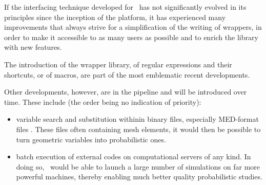 
If the interfacing technique developed for \OT\ has not significantly evolved in its principles since the inception of the platform, it has experienced many improvements that always strive for a simplification of the writing of wrappers, in order to make it accessible to as many users as possible and to enrich the library with new features.

The introduction of the wrapper library, of regular expressions and their shortcuts, or of macros, are part of the most emblematic recent developments.

Other developments, however, are in the pipeline and will be introduced over time. These include (the order being no indication of priority):
\begin{itemize}
\item variable search and substitution withinin binary files, especially MED-format files%
  . These files often containing mesh elements, it would then be possible to turn geometric variables into probabilistic ones.
\item batch execution of external codes on computational servers of any kind. In doing so, \OT\ would be able to launch a large number of simulations on far more powerful machines, thereby enabling much better quality probabilistic studies.
\end{itemize}
